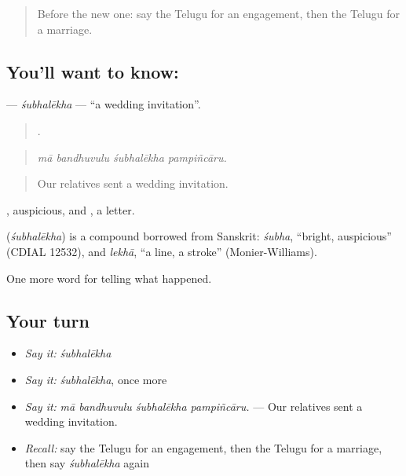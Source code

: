 \label{lesson:TE-C346-subhalekha}



\begin{quote}
Before the new one: say the Telugu for an engagement, then the Telugu for a marriage.
\end{quote}

\subsection*{You'll want to know: }
\textbf{} — \emph{śubhalēkha} — \textquotedblleft{}a wedding invitation\textquotedblright{}.

\begin{quote}
   .
\end{quote}

\begin{quote}
\emph{mā bandhuvulu śubhalēkha pampiñcāru.}
\end{quote}

\begin{quote}
Our relatives sent a wedding invitation.
\end{quote}

, auspicious, and , a letter.

\begin{cousinweb}
\textbf{} (\emph{śubhalēkha}) is a compound borrowed from Sanskrit: \emph{śubha}, \textquotedblleft{}bright, auspicious\textquotedblright{} (CDIAL 12532), and \emph{lekhā}, \textquotedblleft{}a line, a stroke\textquotedblright{} (Monier-Williams).
\end{cousinweb}

\begin{grammarlens}[title={What you've built}]
One more word for telling what happened.
\end{grammarlens}

\subsection*{Your turn}
\begin{itemize}
\raggedright
  \item \emph{Say it:} \emph{śubhalēkha}
  \item \emph{Say it:} \emph{śubhalēkha}, once more
  \item \emph{Say it:} \emph{mā bandhuvulu śubhalēkha pampiñcāru.} — Our relatives sent a wedding invitation.
  \item \emph{Recall:} say the Telugu for an engagement, then the Telugu for a marriage, then say \emph{śubhalēkha} again
\end{itemize}

